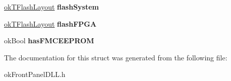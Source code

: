 \begin{DoxyCompactItemize}
\item 
\hypertarget{structokTDeviceInfo_a7f574b55f7e081c86702986fca8c618c}{\hyperlink{structokTFlashLayout}{ok\+T\+Flash\+Layout} {\bfseries flash\+System}}\label{structokTDeviceInfo_a7f574b55f7e081c86702986fca8c618c}

\item 
\hypertarget{structokTDeviceInfo_aae9867cdaf76a9d3d90f5cad99d940d2}{\hyperlink{structokTFlashLayout}{ok\+T\+Flash\+Layout} {\bfseries flash\+F\+P\+G\+A}}\label{structokTDeviceInfo_aae9867cdaf76a9d3d90f5cad99d940d2}

\item 
\hypertarget{structokTDeviceInfo_aac1a994c85b9dcd6e4dc51fe6fefd280}{ok\+Bool {\bfseries has\+F\+M\+C\+E\+E\+P\+R\+O\+M}}\label{structokTDeviceInfo_aac1a994c85b9dcd6e4dc51fe6fefd280}

\end{DoxyCompactItemize}


The documentation for this struct was generated from the following file\+:\begin{DoxyCompactItemize}
\item 
ok\+Front\+Panel\+D\+L\+L.\+h\end{DoxyCompactItemize}
